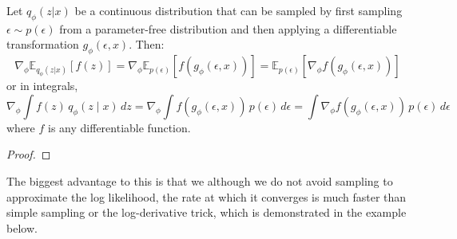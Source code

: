   \begin{theorem}
    Let $q_\phi(z|x)$ be a continuous distribution that can be sampled by first sampling $\epsilon \sim p(\epsilon)$ from a parameter-free distribution and then applying a differentiable transformation $g_\phi(\epsilon, x)$. Then:
    \begin{equation}
       \nabla_\phi \mathbb{E}_{q_\phi(z|x)} [f(z)] = \nabla_\phi \mathbb{E}_{p(\epsilon)} [f(g_\phi(\epsilon, x))] = \mathbb{E}_{p(\epsilon)} [\nabla_\phi f(g_\phi(\epsilon, x))] 
     \end{equation}
    or in integrals, 
    \begin{equation}
     \nabla_\phi \int f(z) \, q_\phi (z \mid x) \,dz = \nabla_\phi \int f(g_\phi (\epsilon, x)) \, p(\epsilon) \,d\epsilon = \int \nabla_\phi f(g_\phi (\epsilon, x)) \, p(\epsilon) \, d\epsilon 
    \end{equation}
    where $f$ is any differentiable function. 
  \end{theorem}
  \begin{proof}
    
  \end{proof}

  The biggest advantage to this is that we although we do not avoid sampling to approximate the log likelihood, the rate at which it converges is much faster than simple sampling or the log-derivative trick, which is demonstrated in the example below. 


